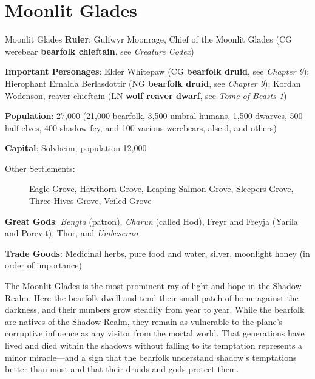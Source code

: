 \documentclass[10pt,a4paper,twoside,bg=print,twocolumn,openany,nodeprecatedcode]{dndbook}
\begin{document}
\section{Moonlit Glades}
\begin{DndSidebar}[float=!b]{Moonlit Glades}
\textbf{Ruler}: Gulfwyr Moonrage, Chief of the Moonlit Glades (CG werebear \textbf{bearfolk chieftain}, see \textit{Creature Codex})



\textbf{Important Personages}: Elder Whitepaw (CG \textbf{bearfolk druid}, see \textit{Chapter 9}); Hierophant Ernalda Berlasdottir (NG \textbf{bearfolk druid}, see \textit{Chapter 9}); Kordan Wodenson, reaver chieftain (LN \textbf{wolf reaver dwarf}, see \textit{Tome of Beasts 1})



\textbf{Population}: 27,000 (21,000 bearfolk, 3,500 umbral humans, 1,500 dwarves, 500 half-elves, 400 shadow fey, and 100 various werebears, alseid, and others)



\textbf{Capital}: Solvheim, population 12,000




\begin{description}
\item[Other Settlements:]
Eagle Grove, Hawthorn Grove, Leaping Salmon Grove, Sleepers Grove, Three Hives Grove, Veiled Grove
\end{description}



\textbf{Great Gods}: \textit{Bengta} (patron), \textit{Charun} (called Hod), Freyr and Freyja (Yarila and Porevit), Thor, and \textit{Umbeserno}



\textbf{Trade Goods}: Medicinal herbs, pure food and water, silver, moonlight honey (in order of importance)





\end{DndSidebar}

The Moonlit Glades is the most prominent ray of light and hope in the Shadow Realm. Here the bearfolk dwell and tend their small patch of home against the darkness, and their numbers grow steadily from year to year. While the bearfolk are natives of the Shadow Realm, they remain as vulnerable to the plane's corruptive influence as any visitor from the mortal world. That generations have lived and died within the shadows without falling to its temptation represents a minor miracle—and a sign that the bearfolk understand shadow's temptations better than most and that their druids and gods protect them.
\end{document}
